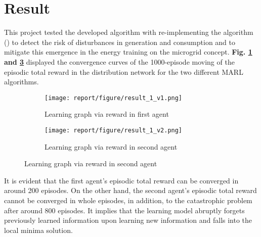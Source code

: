 \documentclass[conference]{IEEEtran}
\begin{document}
\section{Result}
This project tested the developed algorithm with re-implementing the algorithm (\cite{b4}) to detect the risk of disturbances in generation and consumption and to mitigate this emergence in the energy training on the microgrid concept. \textbf{Fig. \ref{fig2} and \ref{fig3}} displayed the convergence curves of the 1000-episode moving of the episodic total reward in the distribution network for the two different MARL algorithms. 
\begin{figure}[htp]
\begin{subfigure}{0.45\columnwidth}
  \texttt{[image: report/figure/result\_1\_v1.png]}
  \caption{Learning graph via reward in first agent}
  \label{fig2}
\end{subfigure}
\hfill
\begin{subfigure}{0.45\columnwidth}
  \texttt{[image: report/figure/result\_1\_v2.png]}
  \caption{Learning graph via reward in second agent}
  \label{fig3}
\end{subfigure}
\end{figure}
It is evident that the first agent's episodic total reward can be converged in around 200 episodes. On the other hand, the second agent's episodic total reward cannot be converged in whole episodes, in addition, to the catastrophic problem after around 800 episodes. It implies that the learning model abruptly forgets previously learned information upon learning new information and falls into the local minima solution. 
\end{document}
